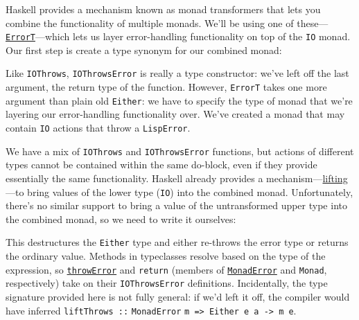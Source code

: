 Haskell provides a mechanism known as monad transformers that lets you combine the functionality of multiple monads. We'll be using one of these---\href{http://www.haskell.org/ghc/docs/6.4/html/libraries/mtl/Control.Monad.Error.html\#t\%3aErrorT}{\texttt{ErrorT}}---which lets us layer error-handling functionality on top of the \verb|IO| monad. Our first step is create a type synonym for our combined monad:
 
 
Like \verb|IOThrows|, \verb|IOThrowsError| is really a type constructor: we've left off the last argument, the return type of the function. However, \verb|ErrorT| takes one more argument than plain old \verb|Either|: we have to specify the type of monad that we're layering our error-handling functionality over. We've created a monad that may contain \verb|IO| actions that throw a \verb|LispError|.
 
We have a mix of \verb|IOThrows| and \verb|IOThrowsError| functions, but actions of different types cannot be contained within the same do-block, even if they provide essentially the same functionality. Haskell already provides a mechanism---\href{http://www.nomaware.com/monads/html/transformers.html\#lifting}{lifting}---to bring values of the lower type (\verb|IO|) into the combined monad. Unfortunately, there's no similar support to bring a value of the untransformed upper type into the combined monad, so we need to write it ourselves:
 
 
This destructures the \verb|Either| type and either re-throws the error type or returns the ordinary value. Methods in typeclasses resolve based on the type of the expression, so \href{http://www.haskell.org/ghc/docs/latest/html/libraries/mtl/Control-Monad-Error.html\#v\%3AthrowError}{\texttt{throwError}} and \texttt{return} (members of \href{http://www.haskell.org/ghc/docs/6.4/html/libraries/mtl/Control.Monad.Error.html\#t\%3aMonadError}{\texttt{MonadError}} and \verb|Monad|, respectively) take on their \verb|IOThrowsError| definitions. Incidentally, the type signature provided here is not fully general: if we'd left it off, the compiler would have inferred \lstinline|liftThrows ::| \lstinline|MonadError| \lstinline|m => Either e a -> m e|.
 
